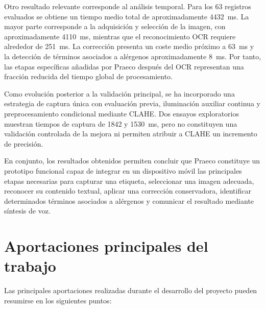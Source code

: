 Otro resultado relevante corresponde al análisis temporal. Para los 63 registros evaluados se obtiene un tiempo medio total de aproximadamente 4432~ms. La mayor parte corresponde a la adquisición y selección de la imagen, con aproximadamente 4110~ms, mientras que el reconocimiento OCR requiere alrededor de 251~ms. La corrección presenta un coste medio próximo a 63~ms y la detección de términos asociados a alérgenos aproximadamente 8~ms. Por tanto, las etapas específicas añadidas por Praeco después del OCR representan una fracción reducida del tiempo global de procesamiento.

Como evolución posterior a la validación principal, se ha incorporado una estrategia de captura única con evaluación previa, iluminación auxiliar continua y preprocesamiento condicional mediante CLAHE. Dos ensayos exploratorios muestran tiempos de captura de 1842 y 1530~ms, pero no constituyen una validación controlada de la mejora ni permiten atribuir a CLAHE un incremento de precisión.

En conjunto, los resultados obtenidos permiten concluir que Praeco constituye un prototipo funcional capaz de integrar en un dispositivo móvil las principales etapas necesarias para capturar una etiqueta, seleccionar una imagen adecuada, reconocer su contenido textual, aplicar una corrección conservadora, identificar determinados términos asociados a alérgenos y comunicar el resultado mediante síntesis de voz.

\section{Aportaciones principales del trabajo}

Las principales aportaciones realizadas durante el desarrollo del proyecto pueden resumirse en los siguientes puntos:

